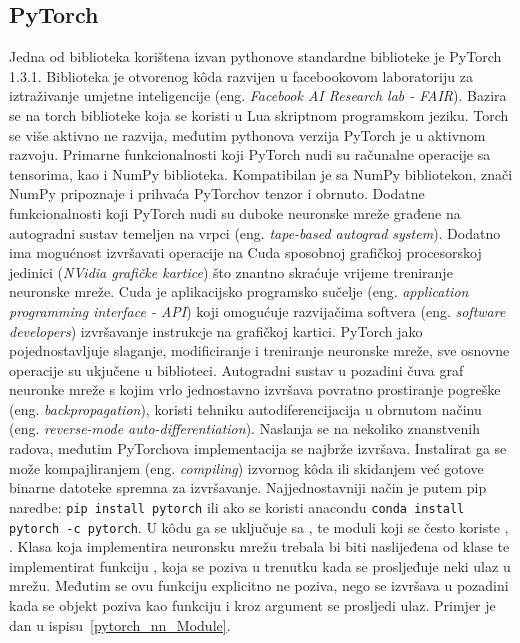 \subsection{PyTorch}
Jedna od biblioteka korištena izvan pythonove standardne biblioteke je PyTorch 1.3.1. Biblioteka je otvorenog k\^oda razvijen u facebookovom laboratoriju za iztraživanje umjetne inteligencije  (eng. \textit{Facebook AI Research lab - FAIR}). Bazira se na torch biblioteke koja se koristi u Lua skriptnom programskom jeziku. Torch se više aktivno ne razvija, međutim pythonova verzija PyTorch je u aktivnom razvoju. Primarne funkcionalnosti koji PyTorch nudi su računalne operacije sa tensorima, kao i NumPy biblioteka. Kompatibilan je sa NumPy bibliotekon, znači NumPy pripoznaje i prihvaća PyTorchov tenzor i obrnuto. Dodatne funkcionalnosti koji PyTorch nudi su duboke neuronske mreže građene na autogradni sustav temeljen na vrpci (eng. \textit{tape-based autograd system}). Dodatno ima mogućnost izvršavati operacije na Cuda sposobnoj grafičkoj procesorskoj jedinici (\emph{NVidia grafičke kartice}) što znantno skraćuje vrijeme treniranje neuronske mreže. Cuda je aplikacijsko programsko sučelje (eng. \textit{application programming interface - API}) koji omogućuje razvijačima softvera (eng. \textit{software developers}) izvršavanje instrukcje na grafičkoj kartici. PyTorch jako pojednostavljuje slaganje, modificiranje i treniranje neuronske mreže, sve osnovne operacije su ukjučene u biblioteci. Autogradni sustav u pozadini čuva graf neuronke mreže s kojim vrlo jednostavno izvršava povratno prostiranje pogreške (eng. \textit{backpropagation}), koristi tehniku autodiferencijacija u obrnutom načinu (eng. \textit{reverse-mode auto-differentiation}). Naslanja se na nekoliko znanstvenih radova, međutim PyTorchova implementacija se najbrže izvršava. Instalirat ga se može kompajliranjem (eng. \textit{compiling}) izvornog k\^oda ili skidanjem već gotove binarne datoteke spremna za izvršavanje. Najjednostavniji način je putem pip naredbe: \lstinline$pip install pytorch$ ili ako se koristi anacondu \lstinline$conda install pytorch -c pytorch$. U k\^odu ga se uključuje sa , te moduli koji se često koriste , . Klasa koja implementira neuronsku mrežu trebala bi biti naslijeđena od klase  te implementirat funkciju , koja se poziva u trenutku kada se prosljeđuje neki ulaz u mrežu. Međutim se ovu funkciju explicitno ne poziva, nego se izvršava u pozadini kada se objekt poziva kao funkciju i kroz argument se prosljedi ulaz. Primjer je dan u ispisu~\ref{pytorch_nn_Module}.
